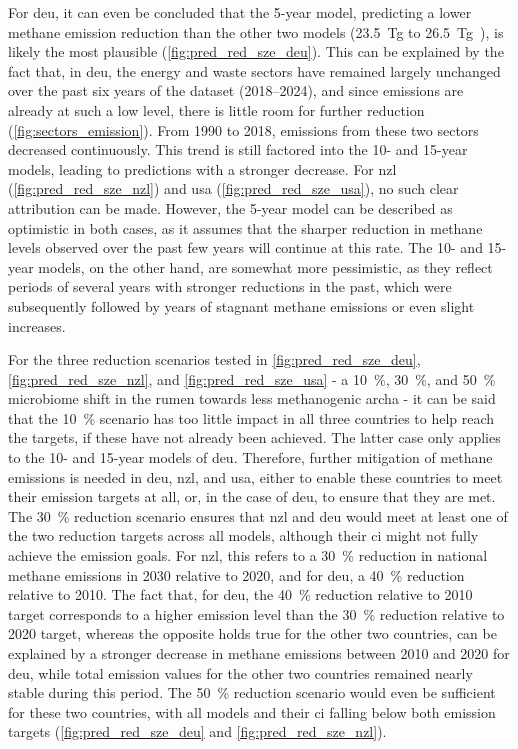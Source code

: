 For \acrshort{deu}, it can even be concluded that the 5-year model, predicting a lower methane emission reduction than the other two models (23.5~Tg to 26.5~Tg~), is likely the most plausible (\cref{fig:pred_red_sze_deu}). This can be explained by the fact that, in \acrshort{deu}, the energy and waste sectors have remained largely unchanged over the past six years of the dataset (2018--2024), and since emissions are already at such a low level, there is little room for further reduction (\cref{fig:sectors_emission}). From 1990 to 2018,  emissions from these two sectors decreased continuously. This trend is still factored into the 10- and 15-year models, leading to predictions with a stronger decrease.
For \acrshort{nzl} (\cref{fig:pred_red_sze_nzl}) and \acrshort{usa} (\cref{fig:pred_red_sze_usa}), no such clear attribution can be made. However, the 5-year model can be described as optimistic in both cases, as it assumes that the sharper reduction in methane levels observed over the past few years will continue at this rate. The 10- and 15-year models, on the other hand, are somewhat more pessimistic, as they reflect periods of several years with stronger reductions in the past, which were subsequently followed by years of stagnant methane emissions or even slight increases.


For the three reduction scenarios tested in \cref{fig:pred_red_sze_deu}, \ref{fig:pred_red_sze_nzl}, and \ref{fig:pred_red_sze_usa} - a 10~\%, 30~\%, and 50~\% microbiome shift in the rumen towards less methanogenic \gls{archa} - it can be said that the 10~\% scenario has too little impact in all three countries to help reach the targets, if these have not already been achieved. The latter case only applies to the 10- and 15-year models of \acrshort{deu}. Therefore, further mitigation of methane emissions is needed in \acrshort{deu}, \acrshort{nzl}, and \acrshort{usa}, either to enable these countries to meet their emission targets at all, or, in the case of \acrshort{deu}, to ensure that they are met.
The 30~\% reduction scenario ensures that \acrshort{nzl} and \acrshort{deu} would meet at least one of the two reduction targets across all models, although their \acrshort{ci} might not fully achieve the emission goals. For \acrshort{nzl}, this refers to a 30~\% reduction in national methane emissions in 2030 relative to 2020, and for \acrshort{deu}, a 40~\% reduction relative to 2010. The fact that, for \acrshort{deu}, the 40~\% reduction relative to 2010 target corresponds to a higher emission level than the 30~\% reduction relative to 2020 target, whereas the opposite holds true for the other two countries, can be explained by a stronger decrease in methane emissions between 2010 and 2020 for \acrshort{deu}, while total emission values for the other two countries remained nearly stable during this period. The 50~\% reduction scenario would even be sufficient for these two countries, with all models and their \acrshort{ci} falling below both emission targets (\cref{fig:pred_red_sze_deu} and \ref{fig:pred_red_sze_nzl}).\clearpage

